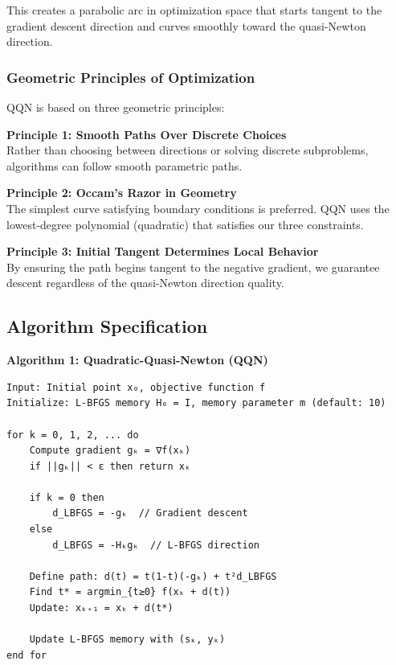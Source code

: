 This creates a parabolic arc in optimization space that starts tangent to the gradient descent direction and curves smoothly toward the quasi-Newton direction.

\hypertarget{geometric-principles-of-optimization}{%
\subsubsection{Geometric Principles of Optimization}\label{geometric-principles-of-optimization}}

QQN is based on three geometric principles:

\textbf{Principle 1: Smooth Paths Over Discrete Choices}\\
Rather than choosing between directions or solving discrete subproblems, algorithms can follow smooth parametric paths.

\textbf{Principle 2: Occam's Razor in Geometry}\\
The simplest curve satisfying boundary conditions is preferred. QQN uses the lowest-degree polynomial (quadratic) that satisfies our three constraints.

\textbf{Principle 3: Initial Tangent Determines Local Behavior}\\
By ensuring the path begins tangent to the negative gradient, we guarantee descent regardless of the quasi-Newton direction quality.

\hypertarget{algorithm-specification}{%
\subsection{Algorithm Specification}\label{algorithm-specification}}

\textbf{Algorithm 1: Quadratic-Quasi-Newton (QQN)}

\begin{verbatim}
Input: Initial point x₀, objective function f
Initialize: L-BFGS memory H₀ = I, memory parameter m (default: 10)

for k = 0, 1, 2, ... do
    Compute gradient gₖ = ∇f(xₖ)
    if ||gₖ|| < ε then return xₖ

    if k = 0 then
        d_LBFGS = -gₖ  // Gradient descent
    else
        d_LBFGS = -Hₖgₖ  // L-BFGS direction

    Define path: d(t) = t(1-t)(-gₖ) + t²d_LBFGS
    Find t* = argmin_{t≥0} f(xₖ + d(t))
    Update: xₖ₊₁ = xₖ + d(t*)

    Update L-BFGS memory with (sₖ, yₖ)
end for
\end{verbatim}

